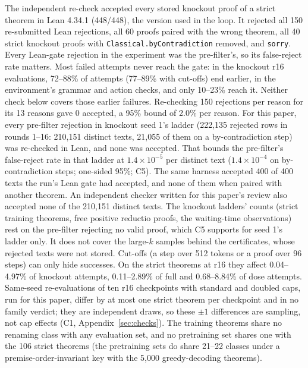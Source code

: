 The independent re-check accepted every stored knockout proof of a strict theorem in Lean 4.34.1 (448/448), the version
used in the loop. It rejected all 150 re-submitted Lean rejections, all 60 proofs paired with the wrong theorem, all 40
strict knockout proofs with \texttt{Classical.byContradiction} removed, and \texttt{sorry}. Every Lean-gate
rejection in the experiment was the pre-filter's, so its false-reject rate matters. Most failed attempts never reach the
gate: in the knockout r16 evaluations, 72--88\% of attempts (77--89\% with cut-offs) end earlier, in the environment's
grammar and action checks, and only 10--23\% reach it. Neither check below covers those earlier failures. Re-checking 150 rejections per reason for its 13
reasons gave 0 accepted, a 95\% bound of 2.0\% per reason. For this paper, every pre-filter rejection in knockout
seed 1's ladder (222,135 rejected rows in rounds 1--16: 210,151 distinct texts, 21,055 of them on a by-contradiction
step) was re-checked in Lean, and none was accepted. That bounds the pre-filter's false-reject rate in that ladder
at $1.4\times10^{-5}$ per distinct text ($1.4\times10^{-4}$ on by-contradiction steps; one-sided 95\%; C5). The
same harness accepted 400 of 400 texts the run's Lean gate had accepted, and none of them when paired with another
theorem. An independent checker written for this paper's review also accepted none of the 210,151 distinct texts.
The knockout ladders' counts (strict training theorems,
free positive reductio proofs, the waiting-time observations) rest on the pre-filter rejecting no valid proof, which C5
supports for seed 1's ladder only. It does not cover the large-$k$ samples behind the certificates, whose rejected texts
were not stored. Cut-offs (a step over 512 tokens or a proof over 96 steps) can only hide successes. On the strict theorems at r16
they affect 0.04--4.97\% of knockout attempts, 0.11--2.89\% of full and 0.68--8.84\% of dose attempts. Same-seed
re-evaluations of ten r16 checkpoints with standard and doubled caps, run for this paper, differ by at most one strict
theorem per checkpoint and in no family verdict; they are independent draws, so these $\pm1$ differences are sampling,
not cap effects (C1, Appendix~\ref{sec:checks}). The training theorems share no renaming class with any evaluation set, and no
pretraining set shares one with the 106 strict theorems (the pretraining sets do share 21--22 classes under a
premise-order-invariant key with the 5,000 greedy-decoding theorems).
